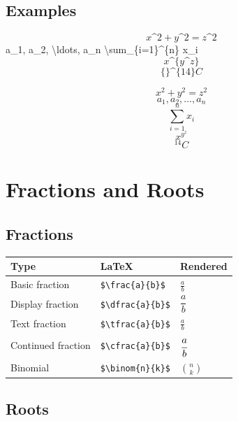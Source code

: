 \documentclass[
  letterpaper,
  DIV=11,
  numbers=noendperiod]{scrartcl}
\newenvironment{Shaded}{\begin{snugshade}}{\end{snugshade}}
\newcommand{\SpecialCharTok}[1]{\textcolor[rgb]{0.37,0.37,0.37}{#1}}
\newcommand{\SpecialStringTok}[1]{\textcolor[rgb]{0.13,0.47,0.30}{#1}}
\begin{document}
\hypertarget{examples}{%
\subsection{Examples}\label{examples}}

\begin{Shaded}
\begin{Highlighting}[]
\SpecialStringTok{$$x\^{}2 + y\^{}2 = z\^{}2$$}
\SpecialStringTok{$$a\_1, a\_2, }\SpecialCharTok{\textbackslash{}ldots}\SpecialStringTok{, a\_n$$}
\SpecialStringTok{$$}\SpecialCharTok{\textbackslash{}sum}\SpecialStringTok{\_\{i=1\}\^{}\{n\} x\_i$$}
\SpecialStringTok{$$x\^{}\{y\^{}z\}$$}
\SpecialStringTok{$$\{\}\^{}\{14\}C$$}
\end{Highlighting}
\end{Shaded}

\[x^2 + y^2 = z^2\] \[a_1, a_2, \ldots, a_n\] \[\sum_{i=1}^{n} x_i\]
\[x^{y^z}\] \[{}^{14}C\]

\hypertarget{fractions-and-roots}{%
\section{Fractions and Roots}\label{fractions-and-roots}}

\hypertarget{fractions}{%
\subsection{Fractions}\label{fractions}}

\begin{longtable}[]{@{}lll@{}}
\toprule()
Type & LaTeX & Rendered \\
\midrule()
\endhead
Basic fraction & \texttt{\$\textbackslash{}frac\{a\}\{b\}\$} &
\(\frac{a}{b}\) \\
Display fraction & \texttt{\$\textbackslash{}dfrac\{a\}\{b\}\$} &
\(\dfrac{a}{b}\) \\
Text fraction & \texttt{\$\textbackslash{}tfrac\{a\}\{b\}\$} &
\(\tfrac{a}{b}\) \\
Continued fraction & \texttt{\$\textbackslash{}cfrac\{a\}\{b\}\$} &
\(\cfrac{a}{b}\) \\
Binomial & \texttt{\$\textbackslash{}binom\{n\}\{k\}\$} &
\(\binom{n}{k}\) \\
\bottomrule()
\end{longtable}

\hypertarget{roots}{%
\subsection{Roots}\label{roots}}
\end{document}
